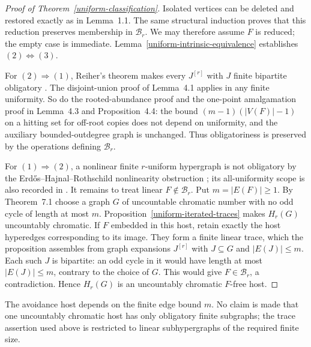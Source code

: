 \documentclass[a4paper,11pt,reqno]{amsart}
\theoremstyle{plain}
\theoremstyle{definition}
\theoremstyle{remark}
\begin{document}
\begin{proof}[Proof of Theorem~\ref{uniform-classification}]
Isolated vertices can be deleted and restored exactly as in Lemma~1.1.
The same structural induction proves that this reduction preserves
membership in $\mathcal B_r$.  We may therefore assume $F$ is reduced;
the empty case is immediate.  Lemma~\ref{uniform-intrinsic-equivalence}
establishes $(2)\Longleftrightarrow(3)$.

For $(2)\Longrightarrow(1)$, Reiher's theorem makes every $J^{[r]}$ with
$J$ finite bipartite obligatory \citep[Theorem~1.2]{reiher2024}.  The
disjoint-union proof of Lemma~4.1 applies in any finite uniformity.  So do
the rooted-abundance proof and the one-point amalgamation proof in
Lemma~4.3 and Proposition~4.4: the bound
$(m-1)(|V(F)|-1)$ on a hitting set for off-root copies does not depend on
uniformity, and the auxiliary bounded-outdegree graph is unchanged.
Thus obligatoriness is preserved by the operations defining
$\mathcal B_r$.

For $(1)\Longrightarrow(2)$, a nonlinear finite $r$-uniform hypergraph is
not obligatory by the Erd\H{o}s--Hajnal--Rothschild nonlinearity
obstruction \citep[Theorem~2]{ehr1973}; its all-uniformity scope is also
recorded in \citet[Section~1]{reiher2024}.  It remains to treat linear
$F\notin\mathcal B_r$.  Put $m=|E(F)|\ge1$.  By Theorem~7.1 choose a
graph $G$ of uncountable chromatic number with no odd cycle of length at
most $m$.  Proposition~\ref{uniform-iterated-traces} makes $H_r(G)$
uncountably chromatic.  If $F$ embedded in this host, retain exactly the
host hyperedges corresponding to its image.  They form a finite linear
trace, which the proposition assembles from graph expansions $J^{[r]}$
with $J\subseteq G$ and $|E(J)|\le m$.  Each such $J$ is bipartite:
an odd cycle in it would have length at most $|E(J)|\le m$, contrary
to the choice of $G$.  This would give $F\in\mathcal B_r$, a
contradiction.  Hence $H_r(G)$ is an uncountably chromatic $F$-free host.
\end{proof}

The avoidance host depends on the finite edge bound $m$.  No claim is made
that one uncountably chromatic host has only obligatory finite subgraphs;
the trace assertion used above is restricted to linear subhypergraphs of
the required finite size.
\end{document}
